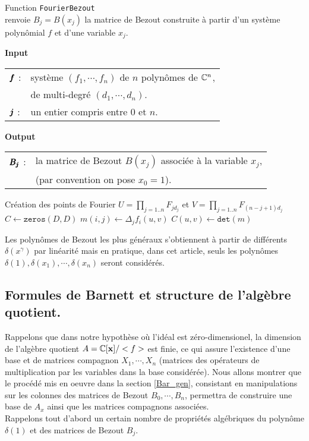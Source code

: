 \documentclass{standalone}
\begin{document}
\begin{algorithm}[H]
\caption{Function \texttt{FourierBezout}\\ renvoie $B_j = B(x_j)$  la matrice de Bezout construite à partir d'un système polynômial $f$ et d'une variable $x_j$.}\label{algo:01}
\textbf{Input\ }
  \begin{tabular}[t]{ll}
    $\pmb{f}$  : &  système $(f_1, \cdots, f_n)$ de $n$ polynômes de $\mathbb{C}^n$,\\ {} & de multi-degré $(d_1, \cdots, d_n)$.\\
     $\pmb{j}$ : & un entier compris entre $0$ et $n$.
  \end{tabular}

\textbf{Output\ }
  \begin{tabular}[t]{ll}
      $\pmb{B_j}$ : & la matrice de Bezout $B(x_j)$ associée à la variable $x_j$,\\
      {} & (par convention on pose $x_0 = 1$).
  \end{tabular}
\begin{algorithmic}
	\State Création des points de Fourier $U = \prod_{j=1..n} F_{jd_j}$ et $V = \prod_{j=1..n} F_{(n-j+1)d_j}$
	\State $C \gets \texttt{zeros}(D, D)$
      		\State $m(i, j) \gets \Delta_j f_i(u, v)$
   		\EndFor
		\State $C(u, v) \gets \texttt{det}(m)$
	\EndFor
\EndFunction
\end{algorithmic}
\end{algorithm}

\begin{rem}
Les polynômes de Bezout les plus généraux s'obtiennent à partir de différents $\delta(x^\gamma)$ par linéarité mais en pratique, dans cet article, seuls les polynômes $\delta(1),\delta(x_1),\cdots,\delta(x_n)$ seront considérés.
\end{rem}

\subsection{Formules de Barnett et structure de l'algèbre quotient.}

Rappelons que dans notre hypothèse où l'idéal est zéro-dimensionel, la dimension de l'algèbre quotient $A = \mathbb{C}[\bold{x}]/<f>$ est finie, ce qui assure l'existence d'une base et de matrices compagnon $X_1,\cdots, X_n$ (matrices des opérateurs de multiplication par les variables dans la base considérée). Nous allons montrer que le procédé mis en oeuvre dans la section \ref{Bar_gen}, consistant en manipulations sur les colonnes des matrices de Bezout $B_0, \cdots, B_n $, permettra de construire une base de $A_x$ ainsi que les matrices compagnons associées.\\
Rappelons tout d'abord un certain nombre de propriétés algébriques du polynôme $\delta(1)$ et des matrices de Bezout $B_j$.
\end{document}
